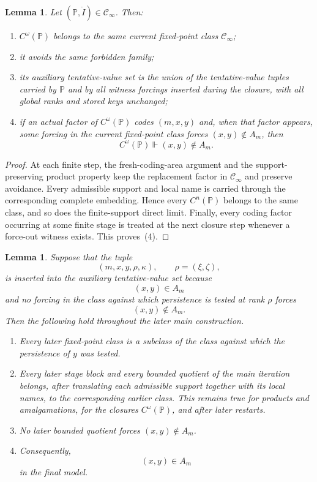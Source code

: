 \documentclass[a4paper,11pt]{article}
\newtheorem{lemma}[theorem]{Lemma}
\newcommand{\forceP}{\mathbb{P}}
\begin{document}
\begin{lemma}\label{UniformizationClosureLemma}
Let $(\forceP,\dot I)\in\mathcal C_\infty$. Then:
\begin{enumerate}
\item $C^\omega(\forceP)$ belongs to the same current fixed-point class $\mathcal C_\infty$;
\item it avoids the same forbidden family;
\item its auxiliary tentative-value set is the union of the tentative-value tuples carried by $\forceP$ and by all witness forcings inserted during the closure, with all global ranks and stored keys unchanged;
\item if an actual factor of $C^\omega(\forceP)$ codes $(m,x,y)$ and, when that factor appears, some forcing in the current fixed-point class forces $(x,y)\notin A_m$, then
\[
C^\omega(\forceP)\Vdash(x,y)\notin A_m.
\]
\end{enumerate}
\end{lemma}

\begin{proof}
At each finite step, the fresh-coding-area argument and the support-preserving product property keep the replacement factor in $\mathcal C_\infty$ and preserve avoidance. Every admissible support and local name is carried through the corresponding complete embedding. Hence every $C^n(\forceP)$ belongs to the same class, and so does the finite-support direct limit. Finally, every coding factor occurring at some finite stage is treated at the next closure step whenever a force-out witness exists. This proves~(4).
\end{proof}

\begin{lemma}\label{UniformizationPersistenceTailLemma}
Suppose that the tuple
\[
(m,x,y,\rho,\kappa),\qquad \rho=(\xi,\zeta),
\]
is inserted into the auxiliary tentative-value set because
\[
(x,y)\in A_m
\]
and no forcing in the class against which persistence is tested at rank $\rho$ forces
\[
(x,y)\notin A_m.
\]
Then the following hold throughout the later main construction.
\begin{enumerate}
\item Every later fixed-point class is a subclass of the class against which the persistence of $y$ was tested.
\item Every later stage block and every bounded quotient of the main iteration belongs, after translating each admissible support together with its local names, to the corresponding earlier class. This remains true for products and amalgamations, for the closures $C^\omega(\forceP)$, and after later restarts.
\item No later bounded quotient forces $(x,y)\notin A_m$.
\item Consequently,
\[
(x,y)\in A_m
\]
in the final model.
\end{enumerate}
\end{lemma}
\end{document}
